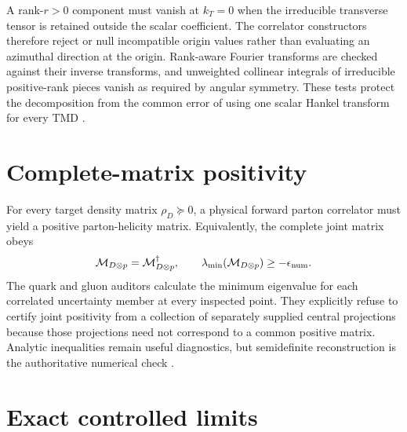 \documentclass[11pt,oneside]{book}
\begin{document}
A rank-$r>0$ component must vanish at $k_T=0$ when the irreducible transverse tensor is retained outside the scalar coefficient.  The correlator constructors therefore reject or null incompatible origin values rather than evaluating an azimuthal direction at the origin.  Rank-aware Fourier transforms are checked against their inverse transforms, and unweighted collinear integrals of irreducible positive-rank pieces vanish as required by angular symmetry.  These tests protect the decomposition from the common error of using one scalar Hankel transform for every TMD \cite{VanDaal2016,BuffingMukherjeeMulders2013,DWSourceAudit2026}.

\section{Complete-matrix positivity}

For every target density matrix $\rho_D\succeq0$, a physical forward parton correlator must yield a positive parton-helicity matrix.  Equivalently, the complete joint matrix obeys
\begin{equation}
 \mathcal M_{D\otimes p}=\mathcal M_{D\otimes p}^\dagger,
 \qquad
 \lambda_{\min}(\mathcal M_{D\otimes p})\ge -\epsilon_{\rm num}.
 \label{eq:joint-positivity-validation}
\end{equation}
The quark and gluon auditors calculate the minimum eigenvalue for each correlated uncertainty member at every inspected point.  They explicitly refuse to certify joint positivity from a collection of separately supplied central projections because those projections need not correspond to a common positive matrix.  Analytic inequalities remain useful diagnostics, but semidefinite reconstruction is the authoritative numerical check \cite{CotognoVanDaalMulders2017,DWProductionBoundary2026}.

\section{Exact controlled limits}
\end{document}
